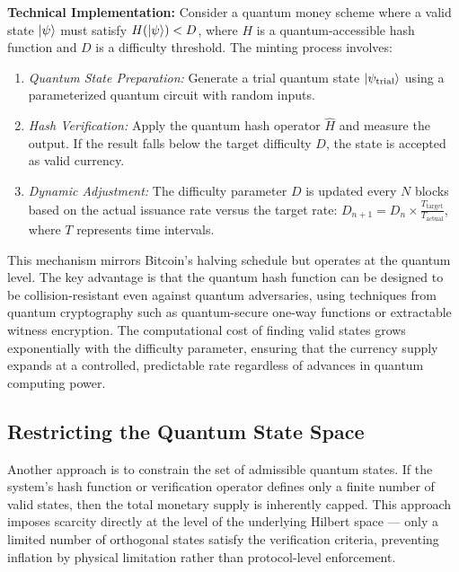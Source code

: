 \documentclass[a4paper,10.5pt,twoside]{article}
\begin{document}
\textbf{Technical Implementation:} Consider a quantum money scheme where a valid state $\ket{\psi}$ must satisfy $H(\ket{\psi}) < D$, where $H$ is a quantum-accessible hash function and $D$ is a difficulty threshold. The minting process involves:
\begin{enumerate}
\item \textit{Quantum State Preparation:} Generate a trial quantum state $\ket{\psi_{\text{trial}}}$ using a parameterized quantum circuit with random inputs.
\item \textit{Hash Verification:} Apply the quantum hash operator $\hat{H}$ and measure the output. If the result falls below the target difficulty $D$, the state is accepted as valid currency.
\item \textit{Dynamic Adjustment:} The difficulty parameter $D$ is updated every $N$ blocks based on the actual issuance rate versus the target rate: $D_{n+1} = D_n \times \frac{T_{\text{target}}}{T_{\text{actual}}}$, where $T$ represents time intervals.
\end{enumerate}

This mechanism mirrors Bitcoin's halving schedule but operates at the quantum level. The key advantage is that the quantum hash function can be designed to be collision-resistant even against quantum adversaries, using techniques from quantum cryptography such as quantum-secure one-way functions or extractable witness encryption. The computational cost of finding valid states grows exponentially with the difficulty parameter, ensuring that the currency supply expands at a controlled, predictable rate regardless of advances in quantum computing power.

\subsection{Restricting the Quantum State Space}\label{s:3.2}
Another approach is to constrain the set of admissible quantum states. If the system's hash function or verification operator defines only a finite number of valid states, then the total monetary supply is inherently capped. This approach imposes scarcity directly at the level of the underlying Hilbert space — only a limited number of orthogonal states satisfy the verification criteria, preventing inflation by physical limitation rather than protocol-level enforcement.
\end{document}
